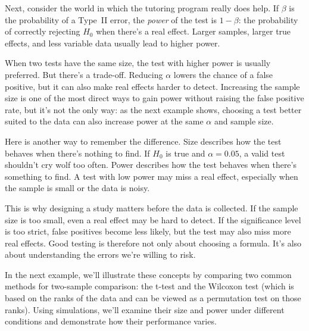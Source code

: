 Next, consider the world in which the tutoring program really does
help. If $\beta$ is the probability of a Type~II error, the
\emph{power} of the test is $1 - \beta$: the probability of correctly
rejecting $H_0$ when there's a real effect. Larger samples, larger
true effects, and less variable data usually lead to higher power.

When two tests have the same size, the test with higher power is
usually preferred. But there's a trade-off. Reducing $\alpha$ lowers
the chance of a false positive, but it can also make real effects
harder to detect. Increasing the sample size is one of the most direct
ways to gain power without raising the false positive rate, but it's
not the only way: as the next example shows, choosing a test better
suited to the data can also increase power at the same $\alpha$ and
sample size.

Here is another way to remember the difference. Size describes how the
test behaves when there's nothing to find. If $H_0$ is true and
$\alpha = 0.05$, a valid test shouldn't cry wolf too often. Power
describes how the test behaves when there's something to find. A test
with low power may miss a real effect, especially when the sample is
small or the data is noisy.

This is why designing a study matters before the data is collected.
If the sample size is too small, even a real effect may be hard to
detect. If the significance level is too strict, false positives become
less likely, but the test may also miss more real effects. Good testing
is therefore not only about choosing a formula. It's also about
understanding the errors we're willing to risk.

In the next example, we'll illustrate these
concepts by comparing two common methods for two-sample comparison:
the t-test and the Wilcoxon test (which is based on the ranks of the
data and can be viewed as a permutation test on those ranks). Using
simulations, we'll examine their size and power under different
conditions and demonstrate how their performance varies.



